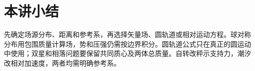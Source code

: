 \section{本讲小结}
先确定场源分布、距离和参考系，再选择矢量场、圆轨道或相对运动方程。球对称分布用包围质量计算场，势和压强仍需按边界积分。圆轨道公式只在真正的圆运动中使用；双星和相落问题要保留共同质心及两体总质量。自转改秤示支持力，潮汐改相对加速度，两者均需明确参考系。
